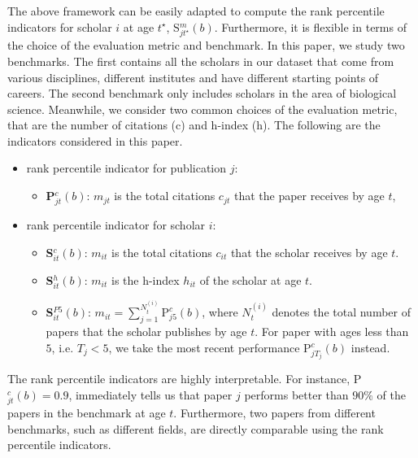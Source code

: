 The above framework can be easily adapted to compute the rank percentile indicators for scholar $i$ at age $t^\star$, S$_{jt^\star}^{m}(b)$. Furthermore, it is flexible in terms of the choice of the evaluation metric and benchmark. In this paper, we study two benchmarks. The first contains all the scholars in our dataset that come from various disciplines, different institutes and have different starting points of careers. The second benchmark only includes scholars in the area of biological science. Meanwhile, we consider two common choices of the evaluation metric, that are the number of citations (c) and h-index (h). The following are the indicators considered in this paper.
\begin{itemize}
    \item rank percentile indicator for publication $j$:
    \begin{itemize}
        \item \textbf{P$_{jt}^c(b)$}: $m_{jt}$ is the total citations $c_{jt}$ that the paper receives by age $t$,
    \end{itemize}
    \item rank percentile indicator for scholar $i$:
    \begin{itemize}
        \item \textbf{S$_{it}^c(b)$}: $m_{it}$ is the total citations $c_{it}$ that the scholar receives by age $t$.
        \item \textbf{S$_{it}^h(b)$}: $m_{it}$ is the h-index $h_{it}$ of the scholar at age $t$.
        \item \textbf{S$_{it}^{P5}(b)$}: $m_{it} = \sum_{j=1}^{N_t^{(i)}} \text{P}_{j5}^c(b)$, where $N_t^{(i)}$ denotes the total number of papers that the scholar publishes by age $t$. For paper with ages less than $5$, i.e. $T_j<5$, we take the most recent performance P$_{jT_j}^c(b)$ instead. 
    \end{itemize}
\end{itemize}

The rank percentile indicators are highly interpretable. For instance, P$_{jt}^c(b)=0.9$, immediately tells us that paper $j$ performs better than $90 \%$ of the papers in the benchmark at age $t$. Furthermore, two papers from different benchmarks, such as different fields, are directly comparable using the rank percentile indicators. 

